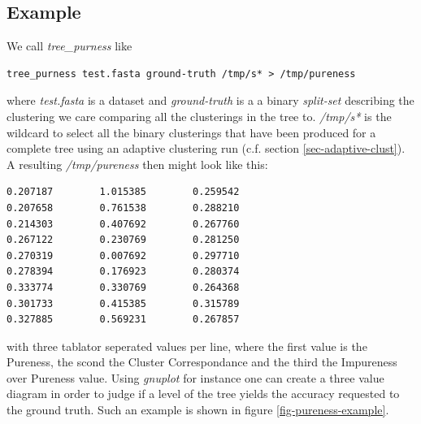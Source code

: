 \subsection{Example}
We call \emph{tree\_purness} like
\begin{lstlisting}
tree_purness test.fasta ground-truth /tmp/s* > /tmp/pureness
\end{lstlisting}
where \emph{test.fasta} is a dataset and \emph{ground-truth} is a
a binary \emph{split-set} describing the clustering we care comparing
all the clusterings in the tree to. \emph{/tmp/s*} is the wildcard to
select all the binary clusterings that have been produced for a
complete tree using an adaptive clustering run (c.f. section
\ref{sec-adaptive-clust}).
A resulting \emph{/tmp/pureness} then might look like this:
\begin{lstlisting}
0.207187        1.015385        0.259542
0.207658        0.761538        0.288210
0.214303        0.407692        0.267760
0.267122        0.230769        0.281250
0.270319        0.007692        0.297710
0.278394        0.176923        0.280374
0.333774        0.330769        0.264368
0.301733        0.415385        0.315789
0.327885        0.569231        0.267857
\end{lstlisting}
with three tablator seperated values per line, where the first value
is the Pureness, the scond the Cluster Correspondance and the third
the Impureness over Pureness value. Using \emph{gnuplot} for instance
one can create a three value diagram in order to judge if a level of
the tree yields the accuracy requested to the ground truth. Such an
example is shown in figure \ref{fig-pureness-example}.
